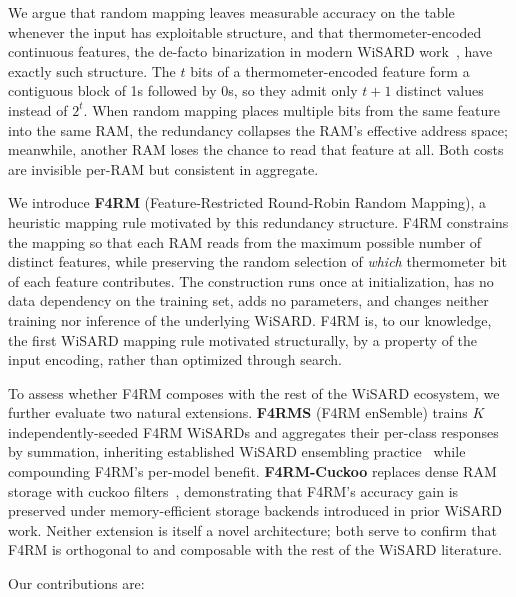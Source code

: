 We argue that random mapping leaves measurable accuracy on the table whenever the input has exploitable structure, and that thermometer-encoded continuous features, the de-facto binarization in modern WiSARD work~\cite{lima2020distributive}, have exactly such structure. The $t$ bits of a thermometer-encoded feature form a contiguous block of 1s followed by 0s, so they admit only $t+1$ distinct values instead of $2^t$. When random mapping places multiple bits from the same feature into the same RAM, the redundancy collapses the RAM's effective address space; meanwhile, another RAM loses the chance to read that feature at all. Both costs are invisible per-RAM but consistent in aggregate.

We introduce \textbf{F4RM} (Feature-Restricted Round-Robin Random Mapping), a heuristic mapping rule motivated by this redundancy structure. F4RM constrains the mapping so that each RAM reads from the maximum possible number of distinct features, while preserving the random selection of \emph{which} thermometer bit of each feature contributes. The construction runs once at initialization, has no data dependency on the training set, adds no parameters, and changes neither training nor inference of the underlying WiSARD. F4RM is, to our knowledge, the first WiSARD mapping rule motivated structurally, by a property of the input encoding, rather than optimized through search.

To assess whether F4RM composes with the rest of the WiSARD ecosystem, we further evaluate two natural extensions. \textbf{F4RMS} (F4RM enSemble) trains $K$ independently-seeded F4RM WiSARDs and aggregates their per-class responses by summation, inheriting established WiSARD ensembling practice~\cite{susskind2023uleen,lusquino2021thesis} while compounding F4RM's per-model benefit. \textbf{F4RM-Cuckoo} replaces dense RAM storage with cuckoo filters~\cite{fan2014cuckoo,santiago2019thesis}, demonstrating that F4RM's accuracy gain is preserved under memory-efficient storage backends introduced in prior WiSARD work. Neither extension is itself a novel architecture; both serve to confirm that F4RM is orthogonal to and composable with the rest of the WiSARD literature.

Our contributions are:

